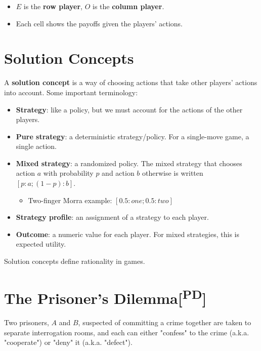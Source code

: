 \documentclass[11pt]{article}
\begin{document}
\begin{itemize}
\item \(E\) is the \textbf{row player}, \(O\) is the \textbf{column player}.
\item Each cell shows the payoffs given the players' actions.
\end{itemize}
\section{Solution Concepts}
\label{sec:org86f8672}

A \textbf{solution concept} is a way of choosing actions that take other players' actions into account.  Some important terminology:

\begin{itemize}
\item \textbf{Strategy}: like a policy, but we must account for the actions of the other players.

\item \textbf{Pure strategy}: a deterministic strategy/policy.  For a single-move game, a single action.

\item \textbf{Mixed strategy}: a randomized policy.  The mixed strategy that chooses action \(a\) with probability \(p\) and action \(b\) otherwise is written \([p:a;(1 - p):b]\).

\begin{itemize}
\item Two-finger Morra example: \([0.5:one;0.5:two]\)
\end{itemize}

\item \textbf{Strategy profile}: an assignment of a strategy to each player.

\item \textbf{Outcome}: a numeric value for each player.  For mixed strategies, this is expected utility.
\end{itemize}

Solution concepts define rationality in games.
\section{The Prisoner's Dilemma[\textsuperscript{PD}]}
\label{sec:orgad3aabe}

Two prisoners, \(A\) and \(B\), suspected of committing a crime together are taken to separate interrogation rooms, and each can either "confess" to the crime (a.k.a. "cooperate") or "deny" it (a.k.a. "defect").
\end{document}
